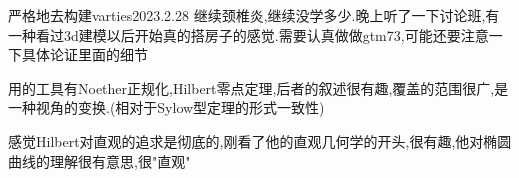 \begin{diary}{严格地去构建varties}{2023.2.28}
继续颈椎炎,继续没学多少.晚上听了一下讨论班,有一种看过3d建模以后开始真的搭房子的感觉.需要认真做做gtm73,可能还要注意一下具体论证里面的细节

用的工具有Noether正规化,Hilbert零点定理,后者的叙述很有趣,覆盖的范围很广,是一种视角的变换.(相对于Sylow型定理的形式一致性)

感觉Hilbert对直观的追求是彻底的,刚看了他的直观几何学的开头,很有趣,他对椭圆曲线的理解很有意思,很"直观"
\end{diary}